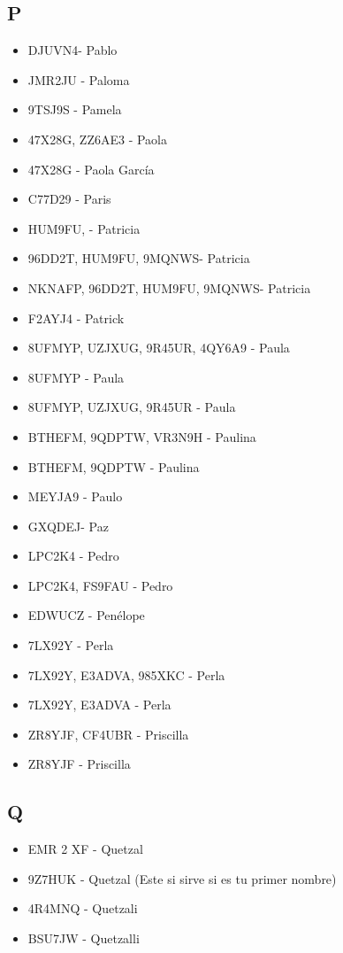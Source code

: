 \subsection*{P}
\begin{itemize}[leftmargin=*,nosep]
\item DJUVN4- Pablo
\item JMR2JU - Paloma
\item 9TSJ9S - Pamela
\item 47X28G, ZZ6AE3 - Paola
\item 47X28G - Paola García
\item C77D29 - Paris
\item HUM9FU, - Patricia
\item 96DD2T, HUM9FU, 9MQNWS- Patricia
\item NKNAFP, 96DD2T, HUM9FU, 9MQNWS- Patricia
\item F2AYJ4 - Patrick
\item 8UFMYP, UZJXUG, 9R45UR, 4QY6A9 - Paula
\item 8UFMYP - Paula
\item 8UFMYP, UZJXUG, 9R45UR - Paula
\item BTHEFM, 9QDPTW, VR3N9H - Paulina
\item BTHEFM, 9QDPTW - Paulina
\item MEYJA9 - Paulo
\item GXQDEJ- Paz
\item LPC2K4 - Pedro
\item LPC2K4, FS9FAU - Pedro
\item EDWUCZ - Penélope
\item 7LX92Y - Perla
\item 7LX92Y, E3ADVA, 985XKC - Perla
\item 7LX92Y, E3ADVA - Perla
\item ZR8YJF, CF4UBR - Priscilla
\item ZR8YJF - Priscilla
\end{itemize}

\subsection*{Q}
\begin{itemize}[leftmargin=*,nosep]
\item EMR 2 XF - Quetzal
\item 9Z7HUK - Quetzal (Este si sirve si es tu primer nombre)
\item 4R4MNQ - Quetzali
\item BSU7JW - Quetzalli
\end{itemize}

